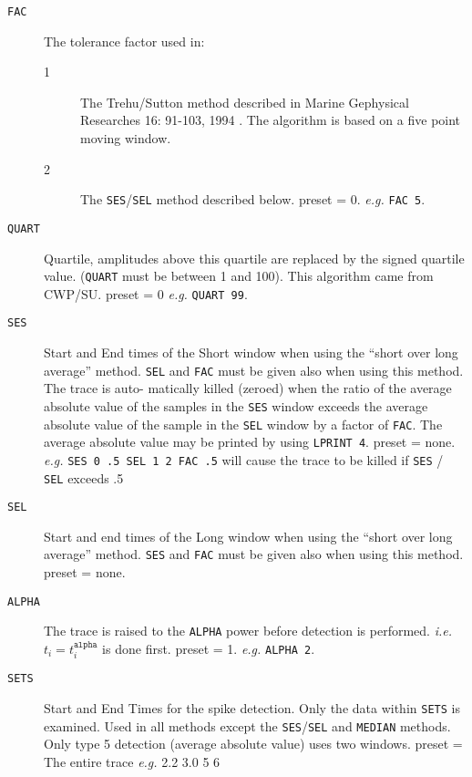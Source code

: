 \begin{description}
\item[\texttt{FAC}] The tolerance factor used in:
    \begin{description}
    \item[1]  The Trehu/Sutton method described in Marine Gephysical Researches 16: 91-103, 1994 \cite{Trehu1994}. The algorithm is based on a five point moving window.
    \item[2]  The \texttt{SES}/\texttt{SEL} method described below.  \Gls{preset} = 0.   \textit{e.g.} \texttt{FAC 5}.
    \end{description}

\item[\texttt{QUART}] Quartile, amplitudes above this quartile are replaced by
         the signed quartile value. (\texttt{QUART} must be between 1 and
         100).  This algorithm came from CWP/SU.
         \Gls{preset} = 0   \textit{e.g.} \texttt{QUART 99}.

\item[\texttt{SES}] Start and End times of the Short window when using the
         ``short over long average'' method.  \texttt{SEL} and \texttt{FAC} must be
         given also when using this method.  The trace is auto-
         matically killed (zeroed) when the ratio of the average
         absolute value of the samples in the \texttt{SES} window exceeds
         the average absolute value of the sample in the \texttt{SEL}
         window by a factor of \texttt{FAC}.  The average absolute value
         may be printed by using \texttt{LPRINT 4}.
         \Gls{preset} = none.
         \textit{e.g.}  \texttt{SES 0 .5 SEL 1 2 FAC .5}     will cause the trace to be
         killed if \texttt{SES} / \texttt{SEL} exceeds .5

\item[\texttt{SEL}] Start and end times of the Long window when using the
         ``short over long average'' method.  \texttt{SES} and \texttt{FAC} must be
         given also when using this method.
         \Gls{preset} = none.

\item[\texttt{ALPHA}] The trace is raised to the \texttt{ALPHA} power before detection is
    performed.  \textit{i.e.} $t_{i} = t_{i}^{\texttt{alpha}}$ is done first.
         \Gls{preset} = 1.       \textit{e.g.}   \texttt{ALPHA 2}.

\item[\texttt{SETS}] Start and End Times for the spike detection.  Only the data
         within \texttt{SETS} is examined.  Used in all methods except the
         \texttt{SES}/\texttt{SEL} and \texttt{MEDIAN} methods.  Only type 5 detection (average
         absolute value) uses two windows.
         \Gls{preset} = The entire trace         \textit{e.g.} 2.2 3.0 5 6


\end{description}
